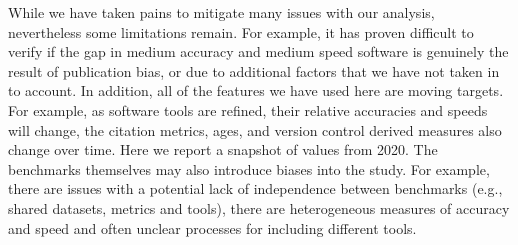 \documentclass{bmcart}
\begin{document}






While we have taken pains to mitigate many issues with our analysis, nevertheless 
some limitations remain. For example, it has proven difficult to verify if the gap in medium accuracy 
and medium speed software is genuinely the result of publication bias, or due to additional factors that we have 
not taken in to account. In addition, all of the features we have used here are moving targets. For example, as software 
tools are refined, their relative accuracies and speeds will change, the citation metrics, ages, and version control 
derived measures also change over time. Here we report a snapshot of values from 2020.  The benchmarks themselves may 
also introduce biases into the study. For example, there are issues with a potential lack of independence between benchmarks 
(e.g., shared datasets, metrics and tools), there are heterogeneous measures of accuracy and speed and often unclear 
processes for including different tools. 

\end{document}
